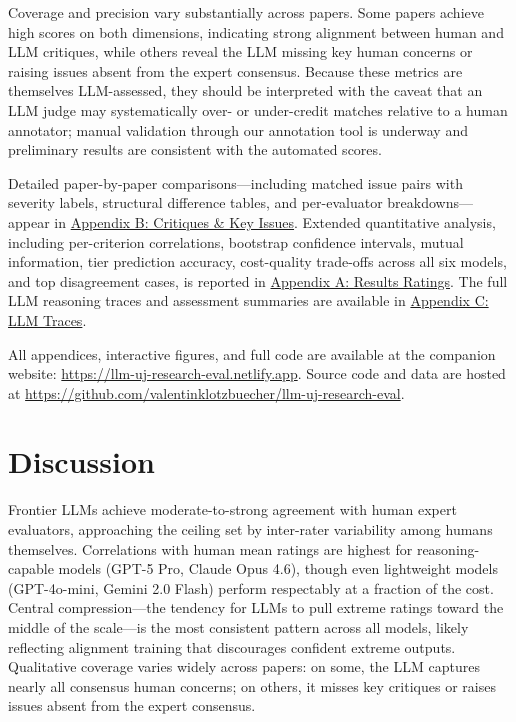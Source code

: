 \documentclass[
  11pt,
  letterpaper,
]{article}
\begin{document}
Coverage and precision vary substantially across papers. Some papers
achieve high scores on both dimensions, indicating strong alignment
between human and LLM critiques, while others reveal the LLM missing key
human concerns or raising issues absent from the expert consensus.
Because these metrics are themselves LLM-assessed, they should be
interpreted with the caveat that an LLM judge may systematically over-
or under-credit matches relative to a human annotator; manual validation
through our annotation tool is underway and preliminary results are
consistent with the automated scores.

Detailed paper-by-paper comparisons---including matched issue pairs with
severity labels, structural difference tables, and per-evaluator
breakdowns---appear in \href{results_critiques.qmd}{Appendix B:
Critiques \& Key Issues}. Extended quantitative analysis, including
per-criterion correlations, bootstrap confidence intervals, mutual
information, tier prediction accuracy, cost-quality trade-offs across
all six models, and top disagreement cases, is reported in
\href{results_ratings.qmd}{Appendix A: Results Ratings}. The full LLM
reasoning traces and assessment summaries are available in
\href{appendix_llm_traces.qmd}{Appendix C: LLM Traces}.

All appendices, interactive figures, and full code are available at the
companion website: \url{https://llm-uj-research-eval.netlify.app}.
Source code and data are hosted at
\url{https://github.com/valentinklotzbuecher/llm-uj-research-eval}.


\section{Discussion}\label{discussion}

Frontier LLMs achieve moderate-to-strong agreement with human expert
evaluators, approaching the ceiling set by inter-rater variability among
humans themselves. Correlations with human mean ratings are highest for
reasoning-capable models (GPT-5 Pro, Claude Opus 4.6), though even
lightweight models (GPT-4o-mini, Gemini 2.0 Flash) perform respectably
at a fraction of the cost. Central compression---the tendency for LLMs
to pull extreme ratings toward the middle of the scale---is the most
consistent pattern across all models, likely reflecting alignment
training that discourages confident extreme outputs. Qualitative
coverage varies widely across papers: on some, the LLM captures nearly
all consensus human concerns; on others, it misses key critiques or
raises issues absent from the expert consensus.
\end{document}
